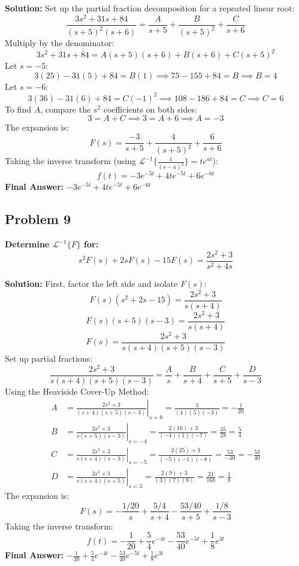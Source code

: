 \documentclass[11pt, a4paper]{article}
\theoremstyle{definition}
\theoremstyle{remark}
\newcommand{\InvLaplace}{\mathcal{L}^{-1}}
\begin{document}
\textbf{Solution:}
Set up the partial fraction decomposition for a repeated linear root:
\[ \frac{3s^2 + 31s + 84}{(s+5)^2(s+6)} = \frac{A}{s+5} + \frac{B}{(s+5)^2} + \frac{C}{s+6} \]
Multiply by the denominator:
\[ 3s^2 + 31s + 84 = A(s+5)(s+6) + B(s+6) + C(s+5)^2 \]
Let $s = -5$:
\[ 3(25) - 31(5) + 84 = B(1) \implies 75 - 155 + 84 = B \implies B = 4 \]
Let $s = -6$:
\[ 3(36) - 31(6) + 84 = C(-1)^2 \implies 108 - 186 + 84 = C \implies C = 6 \]
To find $A$, compare the $s^2$ coefficients on both sides:
\[ 3 = A + C \implies 3 = A + 6 \implies A = -3 \]
The expansion is:
\[ F(s) = \frac{-3}{s+5} + \frac{4}{(s+5)^2} + \frac{6}{s+6} \]
Taking the inverse transform (using $\InvLaplace\{\frac{1}{(s-a)^2}\} = te^{at}$):
\[ f(t) = -3e^{-5t} + 4te^{-5t} + 6e^{-6t} \]
\textbf{Final Answer:} $-3e^{-5t} + 4te^{-5t} + 6e^{-6t}$

\subsection*{Problem 9}
\textbf{Determine $\InvLaplace\{F\}$ for:}
\[ s^2 F(s) + 2s F(s) - 15 F(s) = \frac{2s^2 + 3}{s^2 + 4s} \]

\textbf{Solution:}
First, factor the left side and isolate $F(s)$:
\[ F(s)(s^2 + 2s - 15) = \frac{2s^2 + 3}{s(s + 4)} \]
\[ F(s)(s+5)(s-3) = \frac{2s^2 + 3}{s(s + 4)} \]
\[ F(s) = \frac{2s^2 + 3}{s(s+4)(s+5)(s-3)} \]
Set up partial fractions:
\[ \frac{2s^2 + 3}{s(s+4)(s+5)(s-3)} = \frac{A}{s} + \frac{B}{s+4} + \frac{C}{s+5} + \frac{D}{s-3} \]
Using the Heaviside Cover-Up Method:
\begin{align*}
    A &= \left. \frac{2s^2 + 3}{(s+4)(s+5)(s-3)} \right|_{s=0} = \frac{3}{(4)(5)(-3)} = -\frac{1}{20} \\[6pt]
    B &= \left. \frac{2s^2 + 3}{s(s+5)(s-3)} \right|_{s=-4} = \frac{2(16) + 3}{(-4)(1)(-7)} = \frac{35}{28} = \frac{5}{4} \\[6pt]
    C &= \left. \frac{2s^2 + 3}{s(s+4)(s-3)} \right|_{s=-5} = \frac{2(25) + 3}{(-5)(-1)(-8)} = \frac{53}{-40} = -\frac{53}{40} \\[6pt]
    D &= \left. \frac{2s^2 + 3}{s(s+4)(s+5)} \right|_{s=3} = \frac{2(9) + 3}{(3)(7)(8)} = \frac{21}{168} = \frac{1}{8}
\end{align*}
The expansion is:
\[ F(s) = -\frac{1/20}{s} + \frac{5/4}{s+4} - \frac{53/40}{s+5} + \frac{1/8}{s-3} \]
Taking the inverse transform:
\[ f(t) = -\frac{1}{20} + \frac{5}{4}e^{-4t} - \frac{53}{40}e^{-5t} + \frac{1}{8}e^{3t} \]
\textbf{Final Answer:} $-\frac{1}{20} + \frac{5}{4}e^{-4t} - \frac{53}{40}e^{-5t} + \frac{1}{8}e^{3t}$
\end{document}
